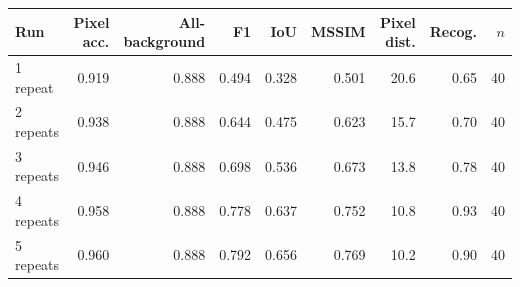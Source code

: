 \begin{tabular}{lrrrrrrrr}
\hline
Run & Pixel acc. & All-background & F1 & IoU & MSSIM & Pixel dist. & Recog. & $n$ \\
\hline
1 repeat & 0.919 & 0.888 & 0.494 & 0.328 & 0.501 & 20.6 & 0.65 & 40 \\
2 repeats & 0.938 & 0.888 & 0.644 & 0.475 & 0.623 & 15.7 & 0.70 & 40 \\
3 repeats & 0.946 & 0.888 & 0.698 & 0.536 & 0.673 & 13.8 & 0.78 & 40 \\
4 repeats & 0.958 & 0.888 & 0.778 & 0.637 & 0.752 & 10.8 & 0.93 & 40 \\
5 repeats & 0.960 & 0.888 & 0.792 & 0.656 & 0.769 & 10.2 & 0.90 & 40 \\
\hline
\end{tabular}
